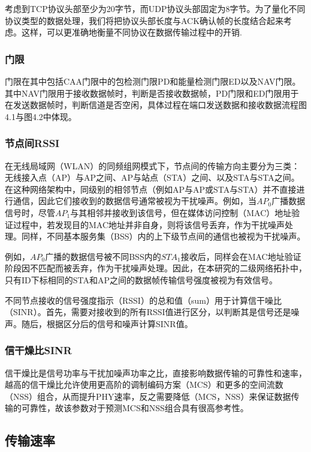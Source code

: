 \documentclass[bwprint]{gmcmthesis}
\begin{document}
考虑到TCP协议头部至少为20字节，而UDP协议头部固定为8字节。为了量化不同协议类型的数据处理，我们将把协议头部长度与ACK确认帧的长度结合起来考虑。这样，可以更准确地衡量不同协议在数据传输过程中的开销.

\subsubsection{门限}

门限在其中包括CAA门限中的包检测门限PD和能量检测门限ED以及NAV门限。其中NAV门限用于接收数据帧时，判断是否接收数据帧，PD门限和ED门限用于在发送数据帧时，判断信道是否空闲，具体过程在端口发送数据和接收数据流程图4.1与图4.2中体现。

\subsubsection{节点间RSSI}

在无线局域网（WLAN）的同频组网模式下，节点间的传输方向主要分为三类：无线接入点（AP）与AP之间、AP与站点（STA）之间、以及STA与STA之间。在这种网络架构中，同级别的相邻节点（例如AP与AP或STA与STA）并不直接进行通信，因此它们接收到的数据信号通常被视为干扰噪声。例如，当$AP_0$广播数据信号时，尽管$AP_1$与其相邻并接收到该信号，但在媒体访问控制（MAC）地址验证过程中，若发现目的MAC地址并非自身，则将该信号丢弃，作为干扰噪声处理。同样，不同基本服务集（BSS）内的上下级节点间的通信也被视为干扰噪声。

例如，$AP_0$广播的数据信号被不同BSS内的$STA_1$接收后，同样会在MAC地址验证阶段因不匹配而被丢弃，作为干扰噪声处理。因此，在本研究的二级网络拓扑中，只有ID下标相同的STA和AP之间的数据帧传输信号强度被视为有效信号。

不同节点接收的信号强度指示（RSSI）的总和值（sum）用于计算信干噪比（SINR）。首先，需要对接收到的所有RSSI值进行区分，以判断其是信号还是噪声。随后，根据区分后的信号和噪声计算SINR值。

\subsubsection{信干燥比SINR}

信干燥比是信号功率与干扰加噪声功率之比，直接影响数据传输的可靠性和速率，越高的信干燥比允许使用更高阶的调制编码方案（MCS）和更多的空间流数（NSS）组合，从而提升PHY速率，反之需要降低（MCS，NSS）来保证数据传输的可靠性，故该参数对于预测MCS和NSS组合具有很高参考性。

\subsection{传输速率}
\end{document}
